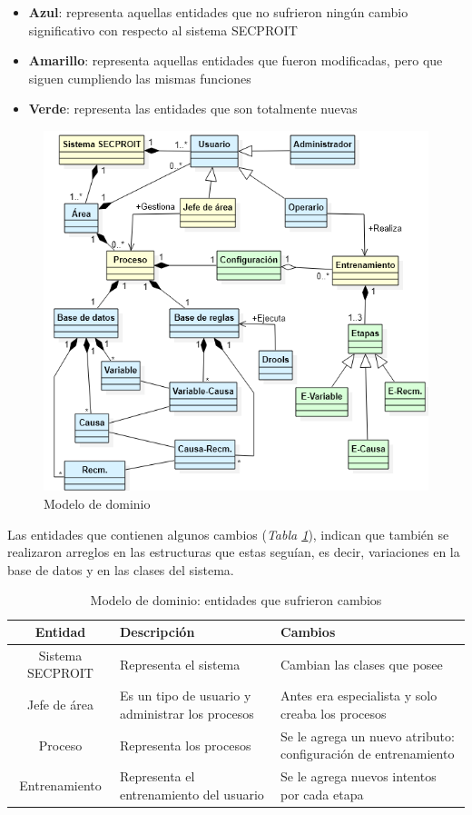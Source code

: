 \begin{itemize}
\item \textbf{Azul}: representa aquellas entidades que no sufrieron ningún cambio significativo con respecto al sistema SECPROIT
\item \textbf{Amarillo}: representa aquellas entidades que fueron modificadas, pero que siguen cumpliendo las mismas funciones
\item \textbf{Verde}: representa las entidades que son totalmente nuevas
\end{itemize}

\begin{figure}[h]
\centering
 \includegraphics[width=0.65\linewidth]{imagen/dominio.png}
 \caption{Modelo de dominio}
 \label{fig:dominio} 
\end{figure}

Las entidades que contienen algunos cambios (\textsl{Tabla \ref{tab:ent-amarilla}}), indican que también se realizaron arreglos en las estructuras que estas seguían, es decir, variaciones en la base de datos y en las clases del sistema.

\begin{table}[H]
\begin{center}
\begin{tabular}{ | c | p{5cm} |  p{5.7cm} | }
\hline
\textbf{Entidad} & \textbf{Descripción} & \textbf{Cambios}\\
\hline
Sistema SECPROIT & Representa el sistema & Cambian las clases que posee \\
\hline
Jefe de área & Es un tipo de usuario y administrar los procesos & Antes era especialista y solo creaba los procesos \\
\hline
Proceso & Representa los procesos & Se le agrega un nuevo atributo: configuración de entrenamiento \\
\hline
Entrenamiento & Representa el entrenamiento del usuario & Se le agrega nuevos intentos por cada etapa \\
\hline
\end{tabular}
\caption{Modelo de dominio: entidades que sufrieron cambios}
\label{tab:ent-amarilla}
\end{center}
\end{table}

